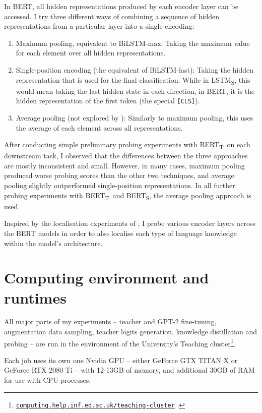 \documentclass[bsc,frontabs,singlespacing,parskip,deptreport]{infthesis}
\def\BERTT{BERT\textsubscript{T}}
\def\BERTS{BERT\textsubscript{S}}
\def\LSTMS{LSTM\textsubscript{S}}
\newcommand\rurl[1]{%
  \href{https://#1}{\nolinkurl{#1}}%
}
\begin{document}
{{{      In BERT, all hidden representations produced by each encoder layer can be accessed. I try three different ways of combining a sequence of hidden representations from a particular layer into a single encoding:
      \begin{enumerate}
        \item Maximum pooling, equivalent to BiLSTM-max: Taking the maximum value for each element over all hidden representations.
        \item Single-position encoding (the equivalent of BiLSTM-last): Taking the hidden representation that is used for the final classification. While in \LSTMS, this would mean taking the last hidden state in each direction, in BERT, it is the hidden representation of the first token (the special \verb|[CLS]|).
        \item Average pooling (not explored by \citeauthor{Conneau_2018}): Similarly to maximum pooling, this uses the average of each element across all representations.
      \end{enumerate}
      After conducting simple preliminary probing experiments with \BERTT~on each downstream task, I observed that the differences between the three approaches are mostly inconsistent and small. However, in many cases, maximum pooling produced worse probing scores than the other two techniques, and average pooling slightly outperformed single-position representations. In all further probing experiments with \BERTT~and \BERTS, the average pooling approach is used.

      Inspired by the localisation experiments of \citet{Tenney_2019b}, I probe various encoder layers across the BERT models in order to also localise each type of language knowledge within the model's architecture.
    }
  }

  \section{Computing environment and runtimes}{
    All major parts of my experiments -- teacher and GPT-2 fine-tuning, augmentation data sampling, teacher logits generation, knowledge distillation and probing -- are run in the environment of the University's Teaching cluster\footnote{\rurl{computing.help.inf.ed.ac.uk/teaching-cluster}.}.

    Each job uses its own one Nvidia GPU -- either GeForce GTX TITAN X or GeForce RTX 2080 Ti -- with 12-13GB of memory, and additional 30GB of RAM for use with CPU processes.

}}
\end{document}
